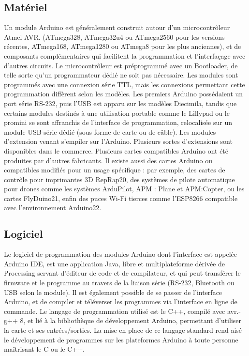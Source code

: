     \subsection{Matériel}
    Un module Arduino est généralement construit autour d’un microcontrôleur Atmel AVR. (ATmega328, ATmega32u4 ou ATmega2560 pour les versions récentes, ATmega168, ATmega1280 ou ATmega8 pour les plus anciennes), et de composants complémentaires qui facilitent la programmation et l’interfaçage avec d’autres circuits. Le microcontrôleur est préprogrammé avec un Bootloader, de telle sorte qu’un programmateur dédié ne soit pas nécessaire. Les modules sont programmés avec une connexion série TTL, mais les connexions permettant cette programmation diffèrent selon les modèles. Les premiers Arduino possédaient un port série RS-232, puis l’USB est apparu sur les modèles Diecimila, tandis que certains modules destinés à une utilisation portable comme le Lillypad ou le promini se sont affranchis de l’interface de programmation, relocalisée sur un module USB-série dédié (sous forme de carte ou de câble). Les modules d’extension venant s’empiler sur l’Arduino. Plusieurs sortes d’extensions sont disponibles dans le commerce.
    Plusieurs cartes compatibles Arduino ont été produites par d’autres fabricants. Il existe aussi des cartes Arduino ou compatibles modifiés pour un usage spécifique : par exemple, des cartes de contrôle pour imprimantes 3D RepRap20, des systèmes de pilote automatique pour drones comme les systèmes ArduPilot, APM : Plane et APM:Copter, ou les cartes FlyDuino21, enfin des puces Wi-Fi tierces comme l’ESP8266 compatible avec l’environnement Arduino22.\cite{30}

    \subsection{Logiciel}
    Le logiciel de programmation des modules Arduino dont l’interface est appelée Arduino IDE, est une application Java, libre et multiplateforme dérivée de Processing servant d’éditeur de code et de compilateur, et qui peut transférer le firmware et le programme au travers de la liaison série (RS-232, Bluetooth ou USB selon le module). Il est également possible de se passer de l’interface Arduino, et de compiler et téléverser les programmes via l’interface en ligne de commande. Le langage de programmation utilisé est le C++, compilé avec avr.-g++ 8, et lié à la bibliothèque de développement Arduino, permettant d’utiliser la carte et ses entrées/sorties. La mise en place de ce langage standard rend aisé le développement de programmes sur les plateformes Arduino à toute personne maîtrisant le C ou le C++.\cite{31}


